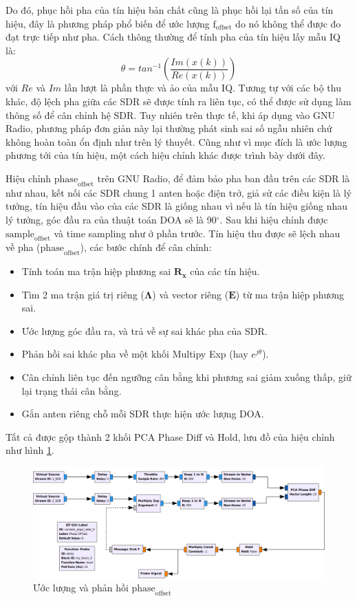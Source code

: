 {Do đó, phục hồi pha của tín hiệu bản chất cũng là phục hồi lại tần số của tín hiệu, đây là phương pháp phổ biến để ước lượng $\textrm{f}_{\textrm{offset}}$ do nó không thể được đo đạt trực tiếp như pha. Cách thông thường để tính pha của tín hiệu lấy mẫu IQ là:
\begin{equation}
	\theta = tan^{-1} \left (\frac{Im (x(k))}{Re(x(k))} \right )
\end{equation}
với $Re$ và $Im$ lần lượt là phần thực và ảo của mẫu IQ. Tương tự với các bộ thu khác, độ lệch pha giữa các SDR sẽ được tính ra liên tục, có thể được sử dụng làm thông số để cân chỉnh hệ SDR. Tuy nhiên trên thực tế, khi áp dụng vào GNU Radio, phương pháp đơn giản này lại thường phát sinh sai số ngẫu nhiên chứ không hoàn toàn ổn định như trên lý thuyết. Cũng như vì mục đích là ước lượng phương tới của tín hiệu, một cách hiệu chỉnh khác được trình bày dưới đây.

Hiệu chỉnh $\textrm{phase}_\textrm{offset}$ trên GNU Radio, để đảm bảo pha ban đầu trên các SDR là như nhau, kết nối các SDR chung 1 anten hoặc điện trở, giả sử các điều kiện là lý tưởng, tín hiệu đầu vào của các SDR là giống nhau vì nếu là tín hiệu giống nhau lý tưởng, góc đầu ra của thuật toán DOA sẽ là 90$^{\circ}$. Sau khi hiệu chỉnh được $\textrm{sample}_\textrm{offset}$ và \textrm{time sampling} như ở  phần trước. Tín hiệu thu được sẽ lệch nhau về pha ($\textrm{phase}_\textrm{offset}$), các bước chính để cân chỉnh:
\begin{itemize}
	\item Tính toán ma trận hiệp phương sai $\mathbf{R}_\mathbf{x}$ của các tín hiệu.
	\item Tìm 2 ma trận giá trị riêng ($\mathbf{\Lambda}$) và vector riêng ($\mathbf{E}$) từ ma trận hiệp phương sai.
	\item Ước lượng góc đầu ra, và trả về sự sai khác pha của SDR.
	\item Phản hồi sai khác pha về một khối Multipy Exp (hay $e^{j\theta}$).
	\item Cân chỉnh liên tục đến ngưỡng cân bằng khi phương sai giảm xuống thấp, giữ lại trạng thái cân bằng.
	\item Gắn anten riêng chỗ mỗi SDR thực hiện ước lượng DOA.
\end{itemize}
Tất cả  được gộp thành 2 khối PCA Phase Diff và Hold, lưu đồ của hiệu chỉnh như hình \ref{fig:phasediff}.

\begin{figure} [!ht]
	\centering
	\includegraphics[width=1\linewidth]{figures/phasediff.png}
	\caption{Ước lượng và phản hồi $\textrm{phase}_\textrm{offset}$}
	\label{fig:phasediff}
\end{figure}

}
